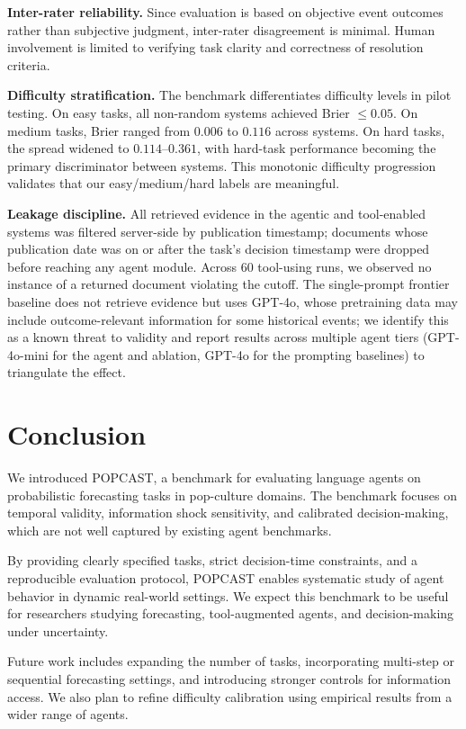 \documentclass{article} %
\newcommand{\benchmarkname}{POPCAST}
\begin{document}
\textbf{Inter-rater reliability.} Since evaluation is based on objective event outcomes rather than subjective judgment, inter-rater disagreement is minimal. Human involvement is limited to verifying task clarity and correctness of resolution criteria.

\textbf{Difficulty stratification.} The benchmark differentiates difficulty levels in pilot testing. On easy tasks, all non-random systems achieved Brier $\le 0.05$. On medium tasks, Brier ranged from $0.006$ to $0.116$ across systems. On hard tasks, the spread widened to $0.114$--$0.361$, with hard-task performance becoming the primary discriminator between systems. This monotonic difficulty progression validates that our easy/medium/hard labels are meaningful.

\textbf{Leakage discipline.} All retrieved evidence in the agentic and tool-enabled systems was filtered server-side by publication timestamp; documents whose publication date was on or after the task's decision timestamp were dropped before reaching any agent module. Across 60 tool-using runs, we observed no instance of a returned document violating the cutoff. The single-prompt frontier baseline does not retrieve evidence but uses GPT-4o, whose pretraining data may include outcome-relevant information for some historical events; we identify this as a known threat to validity and report results across multiple agent tiers (GPT-4o-mini for the agent and ablation, GPT-4o for the prompting baselines) to triangulate the effect.

\section{Conclusion}
\label{sec:conclusion}

We introduced \benchmarkname{}, a benchmark for evaluating language agents on probabilistic forecasting tasks in pop-culture domains. The benchmark focuses on temporal validity, information shock sensitivity, and calibrated decision-making, which are not well captured by existing agent benchmarks.

By providing clearly specified tasks, strict decision-time constraints, and a reproducible evaluation protocol, \benchmarkname{} enables systematic study of agent behavior in dynamic real-world settings. We expect this benchmark to be useful for researchers studying forecasting, tool-augmented agents, and decision-making under uncertainty.

Future work includes expanding the number of tasks, incorporating multi-step or sequential forecasting settings, and introducing stronger controls for information access. We also plan to refine difficulty calibration using empirical results from a wider range of agents.


\end{document}
